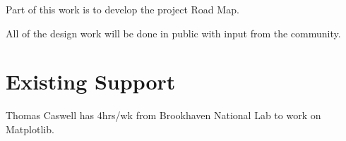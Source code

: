 \documentclass[11pt]{article}  %
\begin{document}
Part of this work is to develop the project Road Map.

All of the design work will be done in public with input from the
community.


\section{Existing Support}

Thomas Caswell has 4hrs/wk from Brookhaven National Lab to work on
Matplotlib.


\clearpage

\end{document}
